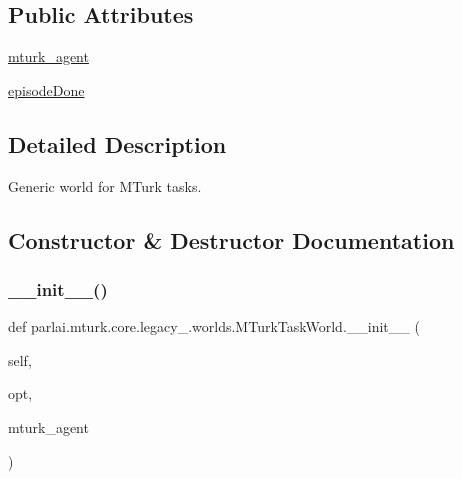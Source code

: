 \subsection*{Public Attributes}
\begin{DoxyCompactItemize}
\item 
\hyperlink{classparlai_1_1mturk_1_1core_1_1legacy__2018_1_1worlds_1_1MTurkTaskWorld_a7c4f2ef7d7f0864848d45ec22b39def7}{mturk\+\_\+agent}
\item 
\hyperlink{classparlai_1_1mturk_1_1core_1_1legacy__2018_1_1worlds_1_1MTurkTaskWorld_aa17f5e23d82dcbc26ac52ff116a370d5}{episode\+Done}
\end{DoxyCompactItemize}


\subsection{Detailed Description}
\begin{DoxyVerb}Generic world for MTurk tasks.
\end{DoxyVerb}
 

\subsection{Constructor \& Destructor Documentation}
\mbox{\label{classparlai_1_1mturk_1_1core_1_1legacy__2018_1_1worlds_1_1MTurkTaskWorld_a5c2d06dd5158af58a8fbf1990f7c6d8f}} 
\subsubsection{\texorpdfstring{\+\_\+\+\_\+init\+\_\+\+\_\+()}{\_\_init\_\_()}}
{\footnotesize\ttfamily def parlai.\+mturk.\+core.\+legacy\+\_.\+worlds.\+M\+Turk\+Task\+World.\+\_\+\+\_\+init\+\_\+\+\_\+ (\begin{DoxyParamCaption}\item[{}]{self,  }\item[{}]{opt,  }\item[{}]{mturk\+\_\+agent }\end{DoxyParamCaption})}

